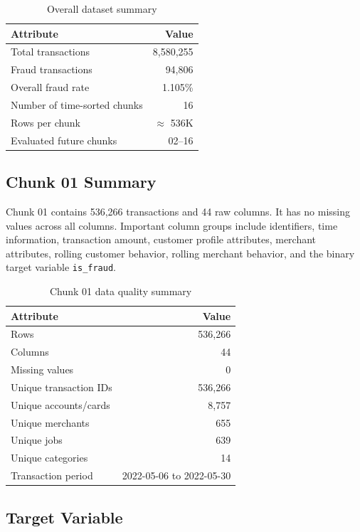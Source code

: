 \documentclass[12pt,a4paper]{article}
\begin{document}
\begin{table}[H]
\centering
\caption{Overall dataset summary}
\begin{tabular}{lr}
\toprule
\textbf{Attribute} & \textbf{Value} \\
\midrule
Total transactions & 8,580,255 \\
Fraud transactions & 94,806 \\
Overall fraud rate & 1.105\% \\
Number of time-sorted chunks & 16 \\
Rows per chunk & $\approx$ 536K \\
Evaluated future chunks & 02--16 \\
\bottomrule
\end{tabular}
\end{table}

\subsection{Chunk 01 Summary}

Chunk 01 contains 536,266 transactions and 44 raw columns. It has no missing values across all columns. Important column groups include identifiers, time information, transaction amount, customer profile attributes, merchant attributes, rolling customer behavior, rolling merchant behavior, and the binary target variable \texttt{is\_fraud}.

\begin{table}[H]
\centering
\caption{Chunk 01 data quality summary}
\begin{tabular}{lr}
\toprule
\textbf{Attribute} & \textbf{Value} \\
\midrule
Rows & 536,266 \\
Columns & 44 \\
Missing values & 0 \\
Unique transaction IDs & 536,266 \\
Unique accounts/cards & 8,757 \\
Unique merchants & 655 \\
Unique jobs & 639 \\
Unique categories & 14 \\
Transaction period & 2022-05-06 to 2022-05-30 \\
\bottomrule
\end{tabular}
\end{table}

\subsection{Target Variable}
\end{document}

